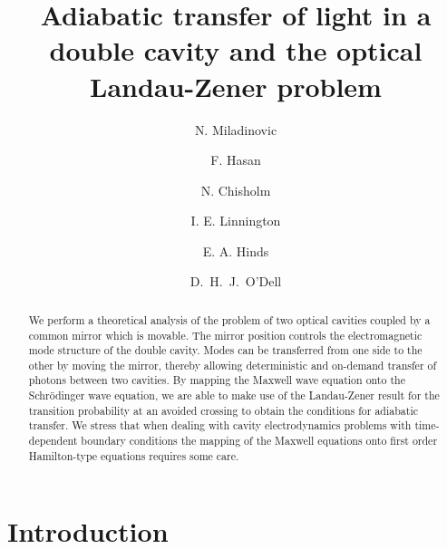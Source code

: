 \documentclass[twocolumn,english,pra,aps,superscriptaddress,floatfix]{revtex4-1}
\begin{document}

\author{N. Miladinovic}
\author{F. Hasan}
\author{N. Chisholm}
\author{I. E. Linnington}
\author{E. A. Hinds}
\author{D.\ H.\ J.\ O'Dell}

\title{Adiabatic transfer of light in a double cavity and the optical Landau-Zener problem}

\begin{abstract}
We perform a theoretical analysis of the problem of two optical cavities coupled by a common mirror which is movable. The mirror position controls the electromagnetic mode structure of the double cavity.  Modes can be transferred from one side to the other by moving the mirror, thereby allowing deterministic and on-demand transfer of photons between two cavities. By mapping the Maxwell wave equation onto the Schr\"{o}dinger wave equation,  we are able to make use of the Landau-Zener result for the transition probability at an avoided crossing to obtain the conditions for adiabatic transfer. We stress that when dealing with cavity electrodynamics problems with time-dependent boundary conditions the mapping of the Maxwell equations onto first order Hamilton-type equations requires some care.
\end{abstract}


\maketitle

\section{Introduction}
\label{sec:intro}
\end{document}
